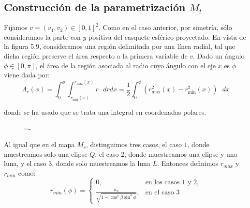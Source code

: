 \subsection{Construcción de la parametrización $M_t$}
Fijamos $v=(v_1,v_2)\in [0,1]^2$. Como en el caso anterior, por simetría, sólo consideramos la parte con $y$ positiva del casquete esférico proyectado. En vista de la figura 5.9, consideramos una región delimitada por una línea radial, tal que dicha región preserve el área respecto a la primera variable de $v$. Dado un ángulo $\phi\in [0,\pi]$, el área de la región asociada al radio cuyo ángulo con el eje $x$ es $\phi$ viene dada por:
$$A_r(\phi) = \int_0^{\phi}\int_{r_{\min}(x)}^{r_{\max}(x)} r \text{ }dr dx = \frac{1}{2}\int_0^{\phi}(r_{\max}^2(x)-r_{\min}^2(x))\text{ } dx$$

donde se ha usado que se trata una integral en coordenadas polares.

\begin{figure}[h]
  \lineskip=-\fboxrule
\end{figure}

 Al igual que en el mapa $M_s$, distinguimos tres casos, el caso $1$, donde muestreamos solo una elipse $Q$, el caso $2$, donde muestreamos una elipse y una luna, y el caso $3$, donde solo muestreamos la luna $L$. Entonces definimos $r_{max}$ y $r_{min}$ como:
\[ r_{min}(\phi) =
   \begin{cases}
      0, & \text{en los casos 1 y 2}, \\
      \frac{a_x}{\sqrt{1-\cos^2\beta\sin^2\phi}}, & \text{en el caso 3}
   \end{cases}
  \]


